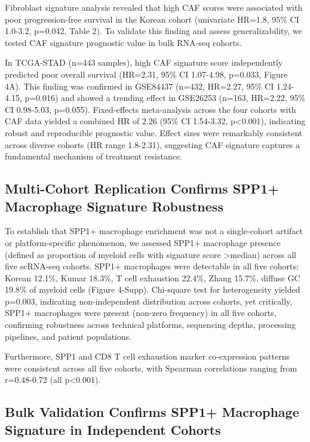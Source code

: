 \documentclass[12pt,twoside]{article}
\begin{document}
Fibroblast signature analysis revealed that high CAF scores were associated with poor progression-free survival in the Korean cohort (univariate HR=1.8, 95\% CI 1.0-3.2, p=0.042, Table 2). To validate this finding and assess generalizability, we tested CAF signature prognostic value in bulk RNA-seq cohorts.

In TCGA-STAD (n=443 samples), high CAF signature score independently predicted poor overall survival (HR=2.31, 95\% CI 1.07-4.98, p=0.033, Figure 4A). This finding was confirmed in GSE84437 (n=432, HR=2.27, 95\% CI 1.24-4.15, p=0.016) and showed a trending effect in GSE26253 (n=163, HR=2.22, 95\% CI 0.98-5.03, p=0.055). Fixed-effects meta-analysis across the four cohorts with CAF data yielded a combined HR of 2.26 (95\% CI 1.54-3.32, p<0.001), indicating robust and reproducible prognostic value. Effect sizes were remarkably consistent across diverse cohorts (HR range 1.8-2.31), suggesting CAF signature captures a fundamental mechanism of treatment resistance.

\subsection{Multi-Cohort Replication Confirms SPP1+ Macrophage Signature Robustness}

To establish that SPP1+ macrophage enrichment was not a single-cohort artifact or platform-specific phenomenon, we assessed SPP1+ macrophage presence (defined as proportion of myeloid cells with signature score >median) across all five scRNA-seq cohorts. SPP1+ macrophages were detectable in all five cohorts: Korean 12.1\%, Kumar 18.3\%, T cell exhaustion 22.4\%, Zhang 15.7\%, diffuse GC 19.8\% of myeloid cells (Figure 4-Supp). Chi-square test for heterogeneity yielded p=0.003, indicating non-independent distribution across cohorts, yet critically, SPP1+ macrophages were present (non-zero frequency) in all five cohorts, confirming robustness across technical platforms, sequencing depths, processing pipelines, and patient populations.

Furthermore, SPP1 and CD8 T cell exhaustion marker co-expression patterns were consistent across all five cohorts, with Spearman correlations ranging from r=0.48-0.72 (all p<0.001).

\subsection{Bulk Validation Confirms SPP1+ Macrophage Signature in Independent Cohorts}
\end{document}
